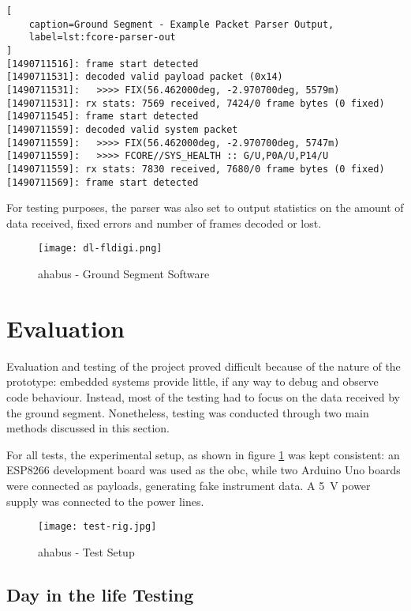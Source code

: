 \begin{lstlisting}[
    caption=Ground Segment - Example Packet Parser Output,
    label=lst:fcore-parser-out
]
[1490711516]: frame start detected
[1490711531]: decoded valid payload packet (0x14)
[1490711531]: 	>>>> FIX(56.462000deg, -2.970700deg, 5579m)
[1490711531]: rx stats: 7569 received, 7424/0 frame bytes (0 fixed)
[1490711545]: frame start detected
[1490711559]: decoded valid system packet
[1490711559]: 	>>>> FIX(56.462000deg, -2.970700deg, 5747m)
[1490711559]: 	>>>> FCORE//SYS_HEALTH :: G/U,P0A/U,P14/U
[1490711559]: rx stats: 7830 received, 7680/0 frame bytes (0 fixed)
[1490711569]: frame start detected
\end{lstlisting}

For testing purposes, the parser was also set to output statistics on the amount
of data received, fixed errors and number of frames decoded or lost.

\begin{figure}[H]
\texttt{[image: dl-fldigi.png]}
\centering
\caption{\acrshort{ahabus} - Ground Segment Software}
\end{figure}

\section{Evaluation}
\label{sec:testing}

Evaluation and testing of the project proved difficult because of the nature
of the prototype: embedded systems provide little, if any way to debug and
observe code behaviour. Instead, most of the testing had to focus on the data
received by the ground segment. Nonetheless, testing was conducted through
two main methods discussed in this section.

For all tests, the experimental setup, as shown in figure \ref{fig:exp-setup} was kept consistent: an ESP8266 development board was used as the \acrshort{obc}, while two Arduino Uno boards were connected as payloads, generating fake instrument data. A \SI{5}{\volt} power supply was connected to the power lines.

\begin{figure}[H]
\texttt{[image: test-rig.jpg]}
\centering
\caption{\acrshort{ahabus} - Test Setup}
\label{fig:exp-setup}
\end{figure}

\subsection{Day in the life Testing}
\label{ssec:method-ditl}

